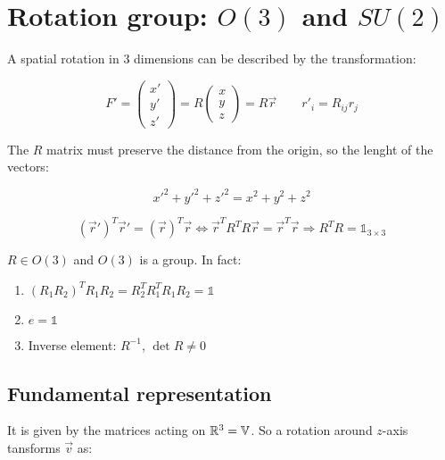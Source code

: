 \documentclass[../../main/main.tex]{subfiles}
\begin{document}
\section{Rotation group: $O(3)$ and $SU(2)$}

A spatial rotation in 3 dimensions can be described by the transformation:

\begin{equation}
	F' =
	\begin{pmatrix}
		x'	\\	y'	\\	z'
	\end{pmatrix}
	=
	R
	\begin{pmatrix}
		x	\\	y	\\	z
	\end{pmatrix}
	=
	R \vec{r}
	\qquad
	r'_i = R_{ij} r_j
\end{equation}

The $R$ matrix must preserve the distance from the origin, so the lenght of the vectors:

\begin{equation*}
	x'^2 + y'^2 + z'^2 = x^2 + y^2 + z^2
\end{equation*}

\begin{equation*}
	(\vec{r}')^{T} \vec{r}' = (\vec{r})^{T} \vec{r}
	\iff
	\vec{r}^{T} R^{T} R \vec{r} = \vec{r}^{T} \vec{r}
	\Longrightarrow
	R^{T} R = \mathds{1}_{3 \times 3}
\end{equation*}

$R \in O(3)$ and $O(3)$ is a group. In fact:
\begin{enumerate}
	\item $(R_1 R_2)^{T} R_1 R_2 = R_2^{T} R_{1}^T R_1 R_2 = \mathds{1}$
	\item $e = \mathds{1}$
	\item Inverse element: $R^{-1}$, $\det{R} \ne 0$
\end{enumerate}



\subsection{Fundamental representation}
It is given by the matrices acting on $\mathbb{R}^{3} = \mathbb{V}$. So a rotation around $z$-axis tansforms $\vec{v}$ as:
\end{document}
